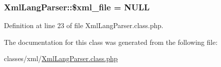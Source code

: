 \hypertarget{classXmlLangParser_a95de36282488ee37a0ef18ef85a6697c}{}
\subsubsection[{\$xml\+\_\+file}]{\setlength{\rightskip}{0pt plus 5cm}Xml\+Lang\+Parser\+::\$xml\+\_\+file = N\+U\+L\+L}\label{classXmlLangParser_a95de36282488ee37a0ef18ef85a6697c}


Definition at line 23 of file Xml\+Lang\+Parser.\+class.\+php.



The documentation for this class was generated from the following file\+:\begin{DoxyCompactItemize}
\item 
classes/xml/\hyperlink{XmlLangParser_8class_8php}{Xml\+Lang\+Parser.\+class.\+php}\end{DoxyCompactItemize}
